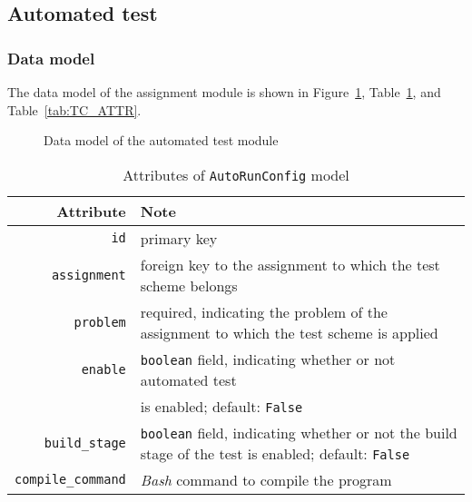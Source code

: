 \subsection{Automated test}
\label{sec:AUTO_TEST}

\subsubsection{Data model}
The data model of the assignment module is shown in
Figure~\ref{fig:AUTO_ER}, Table~\ref{tab:AUTO_ATTR},
and Table~\ref{tab:TC_ATTR}. \bigskip

\begin{figure}[ht]
    \centering
    \usetikzlibrary{er}


    \caption{Data model of the automated test module}
    \label{fig:AUTO_ER}
\end{figure}

\begin{table}[h]
    \centering
    \caption{Attributes of \texttt{AutoRunConfig} model}
    \label{tab:AUTO_ATTR}
    \renewcommand{\arraystretch}{1.3}
    \begin{tabular}[ht]{r|p{4in}}
        \hline
        Attribute & Note \\
        \hline
        \hline

        \texttt{id} & primary key \\
        \hline
        \texttt{assignment} & foreign key to the assignment to which the test
            scheme belongs \\
        \hline
        \hline

        \texttt{problem} & required, indicating the problem of the assignment to
            which the test scheme is applied \\
        \hline
        \texttt{enable} & \texttt{boolean} field, indicating whether or not automated test \\
            & is enabled; default: \texttt{False} \\
        \hline
        \texttt{build\_stage} & \texttt{boolean} field, indicating whether or
            not the build stage of the test is enabled;
            default: \texttt{False} \\
        \hline
        \texttt{compile\_command} & \emph{Bash} command to compile the program \\
        \hline
    \end{tabular}
    \renewcommand{\arraystretch}{1}
\end{table}

